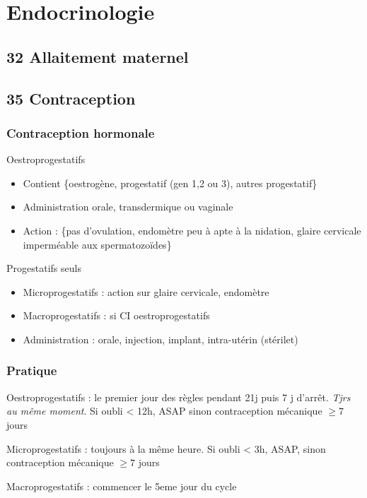 \documentclass[11pt]{article}
\begin{document}
\section{Endocrinologie}
\label{sec:orge3831a8}
\subsection{32 \textdagger{} Allaitement maternel}
\label{sec:org65c64a0}
\subsection{35 \textdagger{} Contraception}
\label{sec:orge7bb55a}
\subsubsection{Contraception hormonale}
\label{sec:org91f8a92}
Oestroprogestatifs
\begin{itemize}
\item Contient \{oestrogène, progestatif (gen 1,2 ou 3), autres progestatif\}
\item Administration orale, transdermique ou vaginale
\item Action : \{pas d'ovulation, endomètre peu à apte à la nidation, glaire
cervicale imperméable aux spermatozoïdes\}
\end{itemize}
Progestatifs seuls 
\begin{itemize}
\item Microprogestatifs : action sur glaire cervicale, endomètre
\item Macroprogestatifs : si CI oestroprogestatifs
\item Administration : orale, injection, implant, intra-utérin (stérilet)
\end{itemize}
\subsubsection{Pratique}
\label{sec:org30d2f10}
Oestroprogestatifs : le premier jour des règles pendant 21j puis 7 j
d'arrêt. \emph{Tjrs au même moment}. Si oubli < 12h, ASAP sinon contraception mécanique \(\ge 7\) jours

Microprogestatifs : toujours à la même heure. Si oubli < 3h, ASAP, sinon
contraception mécanique \(\ge 7\) jours

Macroprogestatifs : commencer le 5eme jour du cycle
\end{document}
